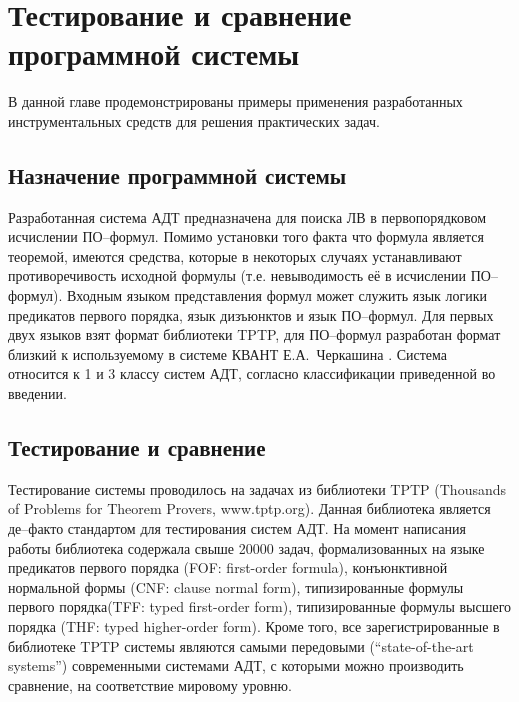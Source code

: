 \chapter{Тестирование и сравнение программной системы}
\label{part:examples}

В данной главе продемонстрированы примеры применения разработанных инструментальных средств  для решения практических задач.

\section{Назначение программной системы}
Разработанная система АДТ предназначена для поиска ЛВ в первопорядковом исчислении ПО--формул. Помимо установки того факта что формула является теоремой, имеются средства, которые в некоторых случаях устанавливают противоречивость исходной формулы (т.е. невыводимость её в исчислении ПО--формул). Входным языком представления формул может служить язык логики предикатов первого порядка, язык дизъюнктов и язык ПО--формул. Для первых двух языков взят формат библиотеки TPTP, для ПО--формул разработан формат близкий к используемому в системе КВАНТ Е.А.~Черкашина \cite{dissChe}. Система относится к 1 и 3 классу систем АДТ, согласно классификации приведенной во введении.




\section{Тестирование и сравнение}

Тестирование системы проводилось на задачах из библиотеки TPTP (Thousands of Problems for Theorem Provers, www.tptp.org). Данная библиотека является де--факто стандартом для тестирования систем АДТ. На момент написания работы библиотека содержала свыше 20000 задач, формализованных на языке предикатов первого порядка (FOF: first-order formula), конъюнктивной нормальной формы (CNF: clause normal form), типизированные формулы первого порядка(TFF: typed first-order form), типизированные формулы высшего порядка (THF: typed higher-order form). Кроме того, все зарегистрированные в библиотеке TPTP системы являются самыми передовыми (``state-of-the-art systems'') современными системами АДТ, с которыми можно производить сравнение, на соответствие мировому уровню.

